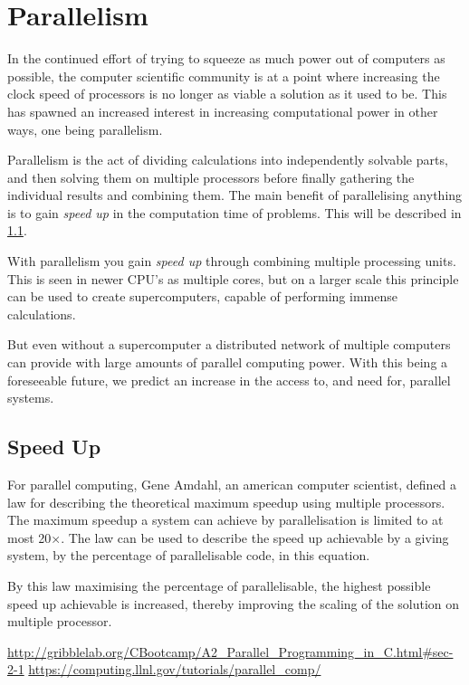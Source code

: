 \section{Parallelism}

In the continued effort of trying to squeeze as much power out of computers as possible, the computer scientific community is at a point where increasing the clock speed of processors is no longer as viable a solution as it used to be. This has spawned an increased interest in increasing computational power in other ways, one being parallelism.

Parallelism is the act of dividing calculations into independently solvable parts, and then solving them on multiple processors before finally gathering the individual results and combining them. The main benefit of parallelising anything is to gain \emph{speed up} in the computation time of problems. This will be described in \cref{sup}.

With parallelism you gain \emph{speed up} through combining multiple processing units. This is seen in newer CPU's as multiple cores, but on a larger scale this principle can be used to create supercomputers, capable of performing immense calculations.

But even without a supercomputer a distributed network of multiple computers can provide with large amounts of parallel computing power. With this being a foreseeable future, we predict an increase in the access to, and need for, parallel systems.

\subsection{Speed Up}\label{sup}

For parallel computing, Gene Amdahl, an american computer scientist, defined a law for describing the theoretical maximum speedup using multiple processors. The maximum speedup a system can achieve by parallelisation is limited to at most 20×.
The law can be used to describe the speed up achievable by a giving system, by the percentage of parallelisable code, in this equation.

By this law maximising the percentage of parallelisable, the highest possible speed up achievable is increased, thereby improving the scaling of the solution on multiple processor.


\url{http://gribblelab.org/CBootcamp/A2_Parallel_Programming_in_C.html#sec-2-1}
\url{https://computing.llnl.gov/tutorials/parallel_comp/}

